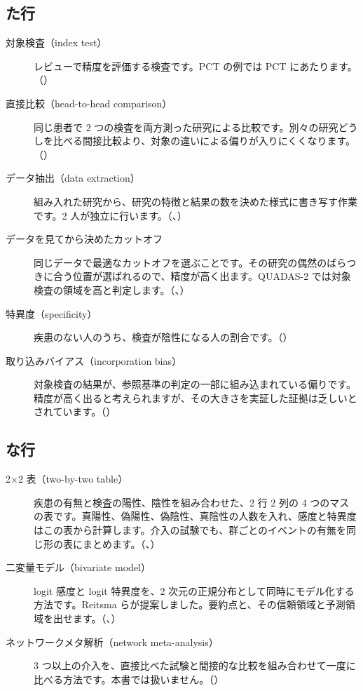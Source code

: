 \subsection*{た行}
\begin{description}
\item[対象検査（index test）] レビューで精度を評価する検査です。PCT の例では PCT にあたります。（）
\item[直接比較（head-to-head comparison）] 同じ患者で 2 つの検査を両方測った研究による比較です。別々の研究どうしを比べる間接比較より、対象の違いによる偏りが入りにくくなります。（）
\item[データ抽出（data extraction）] 組み入れた研究から、研究の特徴と結果の数を決めた様式に書き写す作業です。2 人が独立に行います。（、）
\item[データを見てから決めたカットオフ] 同じデータで最適なカットオフを選ぶことです。その研究の偶然のばらつきに合う位置が選ばれるので、精度が高く出ます。QUADAS-2 では対象検査の領域を高と判定します。（、）
\item[特異度（specificity）] 疾患のない人のうち、検査が陰性になる人の割合です。（）
\item[取り込みバイアス（incorporation bias）] 対象検査の結果が、参照基準の判定の一部に組み込まれている偏りです。精度が高く出ると考えられますが、その大きさを実証した証拠は乏しいとされています。（）
\end{description}

\subsection*{な行}
\begin{description}
\item[2×2 表（two-by-two table）] 疾患の有無と検査の陽性、陰性を組み合わせた、2 行 2 列の 4 つのマスの表です。真陽性、偽陽性、偽陰性、真陰性の人数を入れ、感度と特異度はこの表から計算します。介入の試験でも、群ごとのイベントの有無を同じ形の表にまとめます。（、）
\item[二変量モデル（bivariate model）] logit 感度と logit 特異度を、2 次元の正規分布として同時にモデル化する方法です。Reitsma らが提案しました。要約点と、その信頼領域と予測領域を出せます。（、）
\item[ネットワークメタ解析（network meta-analysis）] 3 つ以上の介入を、直接比べた試験と間接的な比較を組み合わせて一度に比べる方法です。本書では扱いません。（）
\end{description}

